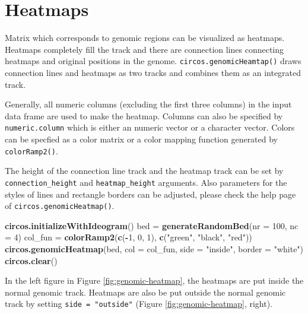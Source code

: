 \documentclass[]{book}
\newenvironment{Shaded}{\begin{snugshade}}{\end{snugshade}}
\newcommand{\KeywordTok}[1]{\textcolor[rgb]{0.13,0.29,0.53}{\textbf{#1}}}
\newcommand{\DataTypeTok}[1]{\textcolor[rgb]{0.13,0.29,0.53}{#1}}
\newcommand{\DecValTok}[1]{\textcolor[rgb]{0.00,0.00,0.81}{#1}}
\newcommand{\StringTok}[1]{\textcolor[rgb]{0.31,0.60,0.02}{#1}}
\newcommand{\OperatorTok}[1]{\textcolor[rgb]{0.81,0.36,0.00}{\textbf{#1}}}
\newcommand{\NormalTok}[1]{#1}
\begin{document}
\section{Heatmaps}\label{genomic-heatmap}

Matrix which corresponds to genomic regions can be visualized as
heatmaps. Heatmaps completely fill the track and there are connection
lines connecting heatmaps and original positions in the genome.
\texttt{circos.genomicHeamtap()} draws connection lines and heatmaps as
two tracks and combines them as an integrated track.

Generally, all numeric columns (excluding the first three columns) in
the input data frame are used to make the heatmap. Columns can also be
specified by \texttt{numeric.column} which is either an numeric vector
or a character vector. Colors can be specfied as a color matrix or a
color mapping function generated by \texttt{colorRamp2()}.

The height of the connection line track and the heatmap track can be set
by \texttt{connection\_height} and \texttt{heatmap\_height} arguments.
Also parameters for the styles of lines and rectangle borders can be
adjusted, please check the help page of
\texttt{circos.genomicHeatmap()}.

\begin{Shaded}
\begin{Highlighting}[]
\KeywordTok{circos.initializeWithIdeogram}\NormalTok{()}
\NormalTok{bed =}\StringTok{ }\KeywordTok{generateRandomBed}\NormalTok{(}\DataTypeTok{nr =} \DecValTok{100}\NormalTok{, }\DataTypeTok{nc =} \DecValTok{4}\NormalTok{)}
\NormalTok{col_fun =}\StringTok{ }\KeywordTok{colorRamp2}\NormalTok{(}\KeywordTok{c}\NormalTok{(}\OperatorTok{-}\DecValTok{1}\NormalTok{, }\DecValTok{0}\NormalTok{, }\DecValTok{1}\NormalTok{), }\KeywordTok{c}\NormalTok{(}\StringTok{"green"}\NormalTok{, }\StringTok{"black"}\NormalTok{, }\StringTok{"red"}\NormalTok{))}
\KeywordTok{circos.genomicHeatmap}\NormalTok{(bed, }\DataTypeTok{col =}\NormalTok{ col_fun, }\DataTypeTok{side =} \StringTok{"inside"}\NormalTok{, }\DataTypeTok{border =} \StringTok{"white"}\NormalTok{)}
\KeywordTok{circos.clear}\NormalTok{()}
\end{Highlighting}
\end{Shaded}

In the left figure in Figure \ref{fig:genomic-heatmap}, the heatmaps are
put inside the normal genomic track. Heatmaps are also be put outside
the normal genomic track by setting \texttt{side\ =\ "outside"} (Figure
\ref{fig:genomic-heatmap}, right).
\end{document}
